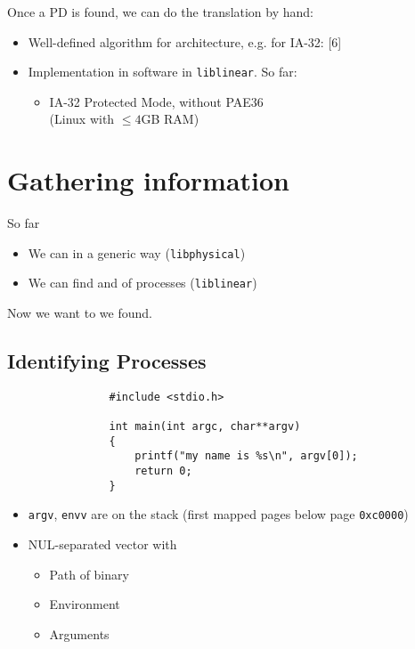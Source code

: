 \documentclass{beamer}
\begin{document}
		\begin{frame}
			Once a PD is found, we can do the translation by hand:
			\begin{itemize}
				\item Well-defined algorithm for architecture, e.g. for IA-32: [6]
				\item Implementation in software in \texttt{liblinear}. So far:
				\begin{itemize}
					\item IA-32 Protected Mode, without PAE36 \\ (Linux with $\leq 4$GB RAM)
				\end{itemize}
			\end{itemize}
		\end{frame}

\section{Gathering information}

	\begin{frame}
		So far
		\begin{itemize}
			\item We can  in a generic way (\texttt{libphysical})
			\item We can find and  of processes (\texttt{liblinear})
		\end{itemize}
		Now we want to  we found.
	\end{frame}

	\subsection{Identifying Processes}
	
		\begin{frame}[fragile]
			\begin{verbatim}
				#include <stdio.h>

				int main(int argc, char**argv)
				{
				    printf("my name is %s\n", argv[0]);
				    return 0;
				}
			\end{verbatim}
			\begin{itemize}
				\item \texttt{argv}, \texttt{envv} are on the stack (first mapped pages below page \texttt{0xc0000})
				\item NUL-separated vector with
				\begin{itemize}
					\item Path of binary
					\item Environment
					\item Arguments
				\end{itemize}
			\end{itemize}
		\end{frame}
\end{document}
